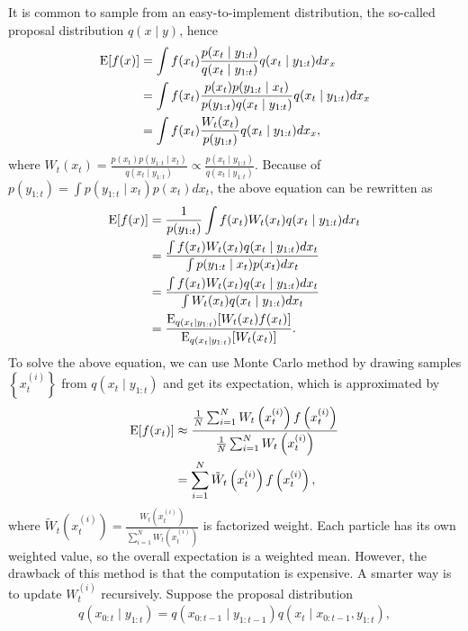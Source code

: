 It is common to sample from an easy-to-implement distribution, the so-called proposal distribution $q(x\mid y)$, hence
\begin{align*}
\mathrm{E}\lbrack f(x) \rbrack &= \int f(x_t )\frac{p(x_t \mid y_{1:t})}{q(x_t \mid y_{1:t})} q(x_t \mid y_{1:t})dx_x\\
&= \int f(x_t )\frac{p(x_t )p(y_{1:t}\mid x_t )}{p(y_{1:t})q(x_t \mid y_{1:t})} q(x_t \mid y_{1:t})dx_x\\
&= \int f(x_t )\frac{W_t (x_t )}{p(y_{1:t})} q(x_t \mid y_{1:t})dx_x,
\end{align*}
where $W_t (x_t )=\frac{p(x_t )p(y_{1:t}\mid x_t )}{q(x_t \mid y_{1:t})} \propto \frac{p(x_t \mid y_{1:t})}{q(x_t \mid y_{1:t})}$. Because of $p(y_{1:t})=\int p(y_{1:t}\mid x_t )p(x_t )dx_t $, the above equation can be rewritten as
\begin{align*}
\mathrm{E}\lbrack f(x)\rbrack&= \frac{1}{p(y_{1:t})}\int f(x_t )W_t (x_t )q(x_t \mid y_{1:t})dx_t \\
&= \frac{ \int f(x_t )W_t (x_t )q(x_t \mid y_{1:t})dx_t  }{\int p(y_{1:t}\mid x_t )p(x_t )dx_t } \\
&= \frac{ \int f(x_t )W_t (x_t )q(x_t \mid y_{1:t})dx_t  }{\int W_t (x_t )q(x_t \mid y_{1:t})dx_t } \\
&= \frac{\mathrm{E}_{q(x_t \mid y_{1:t})}[W_t (x_t )f(x_t )]}{\mathrm{E}_{q(x_t \mid y_{1:t})}[W_t (x_t )]}.
\end{align*}
To solve the above equation, we can use Monte Carlo method by drawing samples $\left\lbrace x_t^{(i)}\right\rbrace$ from $q(x_t \mid y_{1:t})$ and get its expectation, which is approximated by 
\begin{align}\label{PFexpectation}
\begin{split}
\mathrm{E}\lbrack f(x_t )\rbrack &\approx \frac{\frac{1}{N} \sum_{i=1}^{N} W_t\left(x_t^{(i)}\right)f\left(x_t^{(i)}\right)} {\frac{1}{N} \sum_{i=1}^{N} W_t\left(x_t^{(i)}\right)}\\
&= \sum_{i=1}^{N} \tilde{W}_t\left(x_t^{(i)}\right)f\left(x_t^{(i)}\right),
\end{split}
\end{align}
where $\tilde{W}_t\left(x_t^{(i)}\right) = \frac{ W_t\left(x_t^{(i)}\right)}{\sum_{i=1}^NW_t\left(x_t^{(i)}\right)}$ is factorized weight. Each particle has its own weighted value, so the overall expectation is a weighted mean. However, the drawback of this method is that the computation is expensive. A smarter way is to update $W_t^{(i)}$ recursively. Suppose the proposal distribution 
\begin{align*}
q(x_{0:t}\mid y_{1:t}) = q(x_{0:t-1}\mid y_{1:t-1}) q(x_t \mid  x_{0:t-1},y_{1:t}),
\end{align*}
